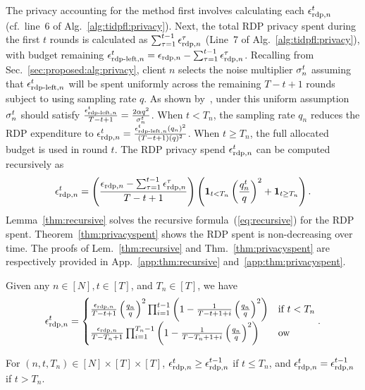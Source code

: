 The privacy accounting for the \algasgo method first involves calculating each ${\epsilon}_{\text{rdp}, n}^t$ (cf.~line~6 of Alg.~\ref{alg:tidpfl:privacy}). Next, the total RDP privacy spent during the first $t$ rounds is calculated as $\sum_{\tau = 1}^{t-1} {\epsilon}_{\text{rdp}, n}^{\tau}$ (Line~7 of Alg.~\ref{alg:tidpfl:privacy}), with  budget remaining ${\epsilon}_{\text{rdp-left}, n}^t={\epsilon}_{\text{rdp}, n}-\sum_{\tau = 1}^{t-1} {\epsilon}_{\text{rdp}, n}^{\tau}$. Recalling from Sec.~\ref{sec:proposed:alg:privacy}, client $n$ selects the noise multiplier $\sigma_n^t$ assuming that ${\epsilon}_{\text{rdp-left}, n}^t$ will be spent uniformly across the remaining $T-t+1$ rounds subject to using sampling rate $q$. As shown by~\cite{mironov2019r}, under this uniform assumption $\sigma_n^t$ should satisfy $\frac{{\epsilon}_{\text{rdp-left}, n}^t}{T-t+1}= \frac{2\alpha q^2}{\sigma_n^t}$. When $t<T_n$, the sampling rate $q_n$ reduces the RDP expenditure to ${\epsilon}_{\text{rdp}, n}^t=\frac{{\epsilon}_{\text{rdp-left}, n}^t(q_n)^2}{(T-t+1)(q)^2}$. When $t\geq T_n$, the full allocated budget is used in round $t$. The RDP privacy spend ${\epsilon}_{\text{rdp}, n}^t$ can be computed recursively as
\begin{align}\label{eq:recursive}
    {\epsilon}_{\text{rdp}, n}^t = \left(\frac{{\epsilon}_{\text{rdp}, n}-\sum_{\tau = 1}^{t-1} {\epsilon}_{\text{rdp}, n}^{\tau}}{T-t+1}\right)\left(\bm{1}_{{t<T_n}}\left(\frac{q_n^t}{q}\right)^2 + \bm{1}_{{t\geq T_n}}\right).
\end{align}
Lemma~\ref{thm:recursive} solves the recursive formula~(\ref{eq:recursive}) for the RDP spent. Theorem~\ref{thm:privacyspent} shows the RDP spent is non-decreasing over time. The proofs of Lem.~\ref{thm:recursive} and Thm.~\ref{thm:privacyspent} are respectively provided in App.~\ref{app:thm:recursive} and~\ref{app:thm:privacyspent}.
\begin{lem} Given any $n\in [N], t\in [T]$, and $T_n\in [T]$, we have
    \begin{align}\label{eq:thm:recursive}
        {\epsilon}_{\text{rdp}, n}^t = \begin{cases} \frac{{\epsilon}_{\text{rdp}, n}}{T-t+1}\left(\frac{q_n}{q}\right)^2\prod_{i=1}^{t-1} \left(1-\frac{1}{T-t+1+i}\left(\frac{q_n}{q}\right)^2\right) & \text{if } t<T_n \\
        \frac{{\epsilon}_{\text{rdp}, n}}{T-T_n+1}\prod_{i=1}^{T_n-1} \left(1-\frac{1}{T-T_n+1+i}\left(\frac{q_n}{q}\right)^2\right) & \text{ow}\end{cases}.
    \end{align}
    \label{thm:recursive}
\end{lem}

\begin{theorem}\label{thm:privacyspent}
For $(n,t,T_n)\in [N]\times[T]\times [T]$, ${\epsilon}_{\text{rdp}, n}^t \geq {\epsilon}_{\text{rdp}, n}^{t-1}$ if $t\leq T_n$, and ${\epsilon}_{\text{rdp}, n}^t = {\epsilon}_{\text{rdp}, n}^{t-1}$ if $t> T_n$.
\end{theorem}


